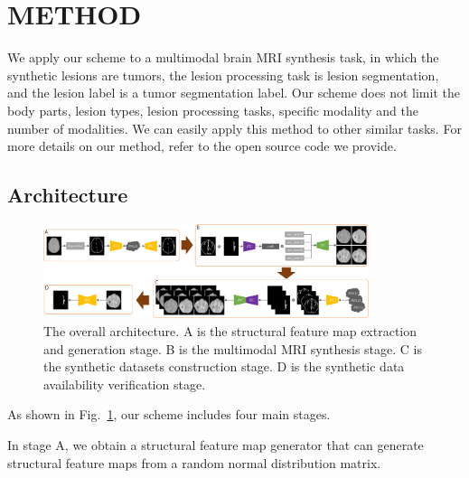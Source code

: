 \documentclass[runningheads]{llncs}
\begin{document}
\section{METHOD}
\label{method}
We apply our scheme to a multimodal brain MRI synthesis task, in which the synthetic lesions are tumors, the lesion processing task is lesion segmentation, and the lesion label is a tumor segmentation label. Our scheme does not limit the body parts, lesion types, lesion processing tasks, specific modality and the number of modalities. We can easily apply this method to other similar tasks. For more details on our method, refer to the open source code we provide.

\subsection{Architecture}
\begin{figure}[t]
	\centering
	\includegraphics[width=0.85\textwidth]{figures/architecture}
	\caption{The overall architecture. A is the structural feature map extraction and generation stage. B is the multimodal MRI synthesis stage. C is the synthetic datasets construction stage. D is the synthetic data availability verification stage.}
	\label{architecture}
\end{figure}
As shown in Fig.~\ref{architecture}, our scheme includes four main stages. 

In stage A, we obtain a structural feature map generator that can generate structural feature maps from a random normal distribution matrix. 
\end{document}
